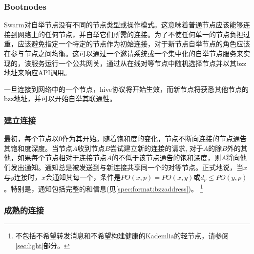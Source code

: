 \subsubsection{Bootnodes}

Swarm对自举节点没有不同的节点类型或操作模式。这意味着普通节点应该能够连接到网络上的任何节点，并自举它们所需的连接。为了不使任何单一的节点负担过重，应该避免指定一个特定的节点作为初始连接，对于新节点自举节点的角色应该在参与节点之间均衡。这可以通过一个邀请系统或一个集中化的自举节点服务来实现的，该服务运行一个公共网关，通过从在线对等节点中随机选择节点并以其bzz地址来响应API调用。

一旦连接到网络中的一个节点，hive协议将开始生效，而新节点将获悉其他节点的bzz地址，并可以开始自举其联通性。

\subsubsection{建立连接}

最初，每个节点以0作为其开始。随着饱和度的变化，节点不断向连接的节点通告其饱和度深度。当节点$A$收到节点$B$尝试建立新的连接的请求, 对于$A$的除$B$外的其他，如果每个节点相对于连接节点$A$的不低于该节点通告的饱和深度，则$A$将向他们发出通知。通知总是被发送到与新连接共享同一个的对等节点。正式地说，当$x$与$y$连接时，$x$会通知其每一个，条件是$\mathit{PO}(x, p) = \mathit{PO}(x, y)$或$d_p\leq \mathit{PO}(y, p)$。特别是，通知包括完整的和信息(见\ref{spec:format:bzzaddress})。%
%
\footnote{不包括不希望转发消息和不希望构建健康的Kademlia的轻节点，请参阅\ref{sec:light}部分。 }

    


\subsubsection{成熟的连接}


